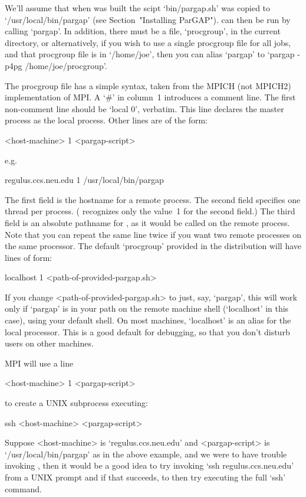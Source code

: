 We'll assume that when {\ParGAP} was built the scipt `bin/pargap.sh' was
copied to `/usr/local/bin/pargap' (see Section~"Installing ParGAP").
{\ParGAP} can then be run by calling `pargap'. In addition, there  must  be  
a file, `procgroup', in the current directory, or alternatively, if you wish
to use a single procgroup file for all jobs, and that procgroup file is in  
`/home/joe', then you can alias `pargap' to `pargap -p4pg /home/joe/procgroup'.

The  procgroup  file  has  a  simple  syntax,  taken from the MPICH 
(not MPICH2) implementation of MPI. A `\#' in column~1  introduces
a comment line. The first non-comment line should be `local 0', verbatim.
This line declares the master process as the local process.  Other  lines
are of the form:

<host-machine> 1 <pargap-script>

e.g.

\begintt
regulus.ccs.neu.edu 1 /usr/local/bin/pargap
\endtt

The first field is the hostname for a remote process.  The  second  field
specifies one thread per process. ({\ParGAP} recognizes only the  value~1
for the second field.) The  third  field  is  an  absolute  pathname  for
{\ParGAP}, as it would be called on the remote process. Note that you can
repeat the same line twice if you want two remote {\ParGAP} processes  on
the same processor. The default `procgroup' provided in the  distribution
will have lines of form:

localhost 1 <path-of-provided-pargap.sh>

If you change <path-of-provided-pargap.sh> to just, say,  `pargap',  this
will work only if `pargap' is in your path on the  remote  machine  shell
(`localhost' in this case), using your default shell. On  most  machines,
`localhost' is an alias for the local processor. This is a  good  default
for debugging, so that you don't disturb users on other machines.

MPI will use a line

<host-machine> 1 <pargap-script>

to create a UNIX subprocess executing:

ssh <host-machine> <pargap-script>

Suppose <host-machine> is `regulus.ccs.neu.edu'  and  <pargap-script>  is
`/usr/local/bin/pargap' as in the above example,  and  we  were  to  have
trouble invoking {\ParGAP}, then it would be a good idea to try  invoking
`ssh regulus.ccs.neu.edu' from a UNIX prompt and  if  that  succeeds,  to
then try executing the full `ssh' command.

